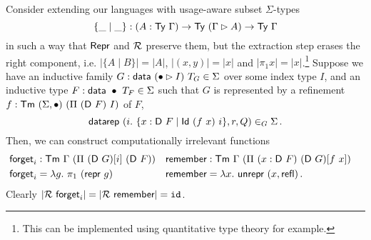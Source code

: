 Consider extending our languages with usage-aware
subset $\Sigma$-types
\[
\{ \_ \mid \_ \} : (A : \textsf{Ty}\ \Gamma) \to \textsf{Ty}\ (\Gamma \rhd A) \to \textsf{Ty}\ \Gamma
\]
in such a way that $\textsf{Repr}$ and $\mathcal{R}$ preserve them, but the extraction
step erases the right component, i.e. $|\{A \mid B\}| = |A|$, $|(x, y)| = |x|$ and $|\pi_1 x| =
|x|$.\footnote{This can be implemented using quantitative type theory for example.}
Suppose we have an inductive family $G : \textsf{data}\ (\bullet \rhd I)\ T_G
\in \Sigma$ over some index type $I$, and an inductive type $F : \mta{data}\ \bullet\
T_F \in \Sigma$ such that $G$ is represented by a refinement $f : \textsf{Tm}\
(\Sigma,\bullet)\ (\Pi\ (\textsf{D}\ F)\ I)$ of $F$,
\[
    \textsf{datarep}\ (i.\ \{ x : \textsf{D}\ F \mid \textsf{Id}\ (f\ x)\ i \}, r, Q) \in_G \Sigma \,.
\]
Then, we can construct computationally irrelevant functions
\begin{align*}
&\begin{aligned}
&\mta{forget}_i : \Tm\ \Gamma\ (\Pi\ (\mta{D}\ G)[i]\ (\mta{D}\ F)) \\
&\mta{forget}_i = \lambda g.\ \pi_1\ (\mta{repr}\ g)
\end{aligned} \quad \begin{aligned}
&\mta{remember} : \Tm\ \Gamma\ (\Pi\ (x : \mta{D}\ F)\ (\mta{D}\ G)[f\ x]) \\
&\mta{remember} = \lambda x.\ \mta{unrepr}\ (x, \mta{refl}) \,.
\end{aligned}
\end{align*}
Clearly $|\R\ \mta{forget}_i| = |\R\ \mta{remember}| = \texttt{id}$.
